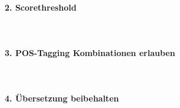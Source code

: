 \paragraph{2. Scorethreshold}\mbox{}\\

\paragraph{3. POS-Tagging Kombinationen erlauben}\mbox{}\\

\paragraph{4. Übersetzung beibehalten}\mbox{}\\


\newpage
